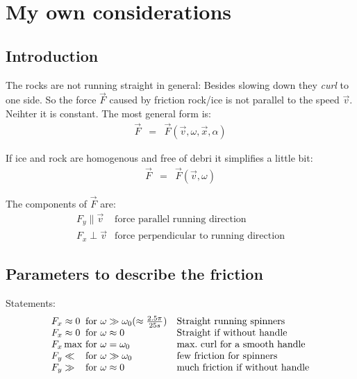 \section{My own considerations}

\subsection{Introduction}

The rocks are not running straight in general: Besides slowing down they
\emph{curl} to one side. So the force $ \vec{F} $ caused by friction
rock/ice is not parallel to the speed $ \vec{v}
$. Neihter it is constant. The most general form is:
\begin{eqnarray}
    \vec{ F } &=& \vec{ F }( \vec{v}, \omega, \vec{x}, \alpha )
\end{eqnarray}

If ice and rock are homogenous and free of debri it simplifies a little
bit:
\begin{eqnarray}
    \vec{ F } &=& \vec{ F }( \vec{v}, \omega )
\end{eqnarray}

The components of $ \vec{ F } $ are:
\begin{equation}
\begin{array}{ll}
F_y \parallel \vec{v} & \textrm{force parallel running direction} \\
F_x \perp     \vec{v} & \textrm{force perpendicular to running direction}
\end{array}
\end{equation}

\subsection{Parameters to describe the friction}

Statements:
\begin{equation}\begin{array}{l@{\textrm{ for }}ll}
F_x \approx 0 & \omega \gg \omega_0 (\approx \frac{2.5\pi}{25s}) & \textrm{Straight running spinners} \\
F_x \approx 0 & \omega \approx 0    & \textrm{Straight if without handle} \\
F_x \max      & \omega = \omega_0   & \textrm{max.\ curl for a smooth handle} \\
F_y \ll       & \omega \gg \omega_0 & \textrm{few friction for spinners} \\
F_y \gg       & \omega \approx 0    & \textrm{much friction if without handle} \\
\end{array}\end{equation}

